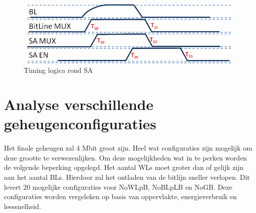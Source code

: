 \begin{figure}[!ht]
  \centering
  \includegraphics[scale=0.9]{../fig/hfdstk-timing-sa2.png}
  \caption[SA:timing]{Timing logica rond SA}
  \label{fig:sa_timing2}
\end{figure}

\section{Analyse verschillende geheugenconfiguraties}
\paragraph{}
Het finale geheugen zal 4 Mbit groot zijn. Heel wat configuraties zijn mogelijk om deze grootte te verwezenlijken. Om deze mogelijkheden wat in te perken worden de volgende beperking opgelegd. Het aantal WLs moet groter dan of gelijk zijn aan het aantal BLs. Hierdoor zal het ontladen van de bitlijn sneller verlopen. Dit levert 20 mogelijke configuraties voor NoWLpB, NoBLpLB en NoGB. Deze configuraties worden vergeleken op basis van oppervlakte, energieverbruik en leessnelheid. 

